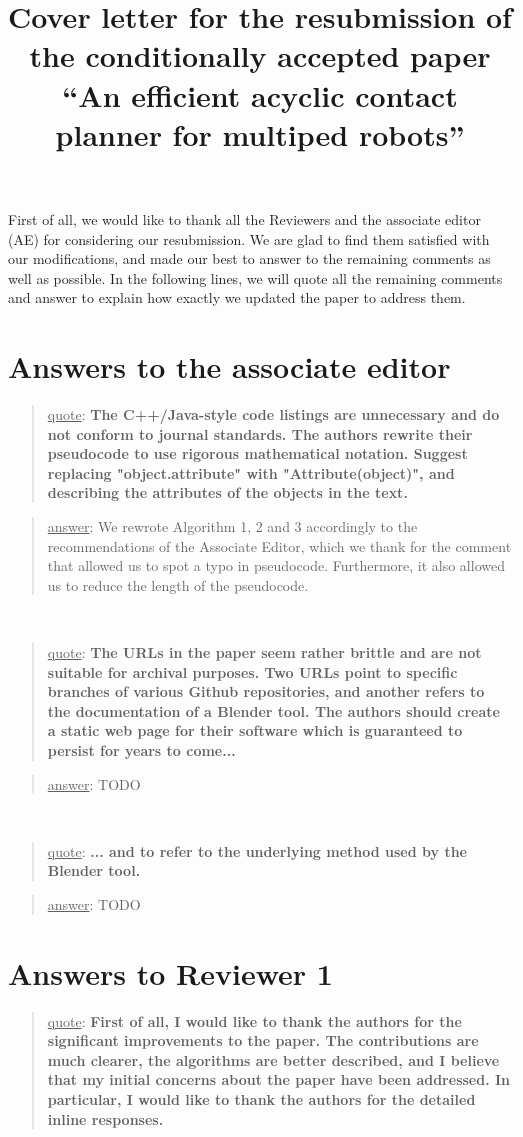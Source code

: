 \documentclass[a4paper]{article}
\author {}
\title {Cover letter for the resubmission of the conditionally accepted paper ``An efficient acyclic contact planner for multiped robots''}
\date {}
\newcommand{\ndone}[0]{\textcolor{red}{TODO}}
\newcommand\quot[1]{\begin{quote} \underline{quote}: \textbf{#1}\end{quote}}
\newcommand\as[1]{\begin{quote} \underline{answer}: {#1}\end{quote} }
\begin{document}
\maketitle


First of all, we would like to thank all the Reviewers and the associate editor (AE) for considering our resubmission.
We are glad to find them satisfied with our modifications, and made our best to answer to the remaining comments as well as possible.
In the following lines, we will quote all the remaining comments and answer to explain how exactly we updated the paper to address them.


\section{Answers to the associate editor}

\quot {The C++/Java-style code listings are unnecessary and do not conform
to journal standards.  The authors rewrite their pseudocode to use
rigorous mathematical notation.  Suggest replacing "object.attribute"
with "Attribute(object)", and describing the attributes of the objects
in the text.
}

\as{We rewrote Algorithm 1, 2 and 3 accordingly to the recommendations of the Associate Editor, which we thank for the comment that allowed us to spot
a typo in pseudocode. Furthermore, it also allowed us to reduce the length of the pseudocode.}
\leavevmode \\

\quot {The URLs in the paper seem rather brittle and are not suitable for
archival purposes.  Two URLs point to specific branches of various
Github repositories, and another refers to the documentation of a
Blender tool.  The authors should create a static web page for their
software which is guaranteed to persist for years to come... }

\as{TODO}

\leavevmode \\

\quot {... and to refer
to the underlying method used by the Blender tool.}

\as{TODO}

\section{Answers to Reviewer 1}

\quot{First of all, I would like to thank the authors for the significant
improvements to the paper. The contributions are much clearer, the
algorithms are better described, and I believe that my initial concerns
about the paper have been addressed. In particular, I would like to
thank the authors for the detailed inline responses.}
\end{document}
